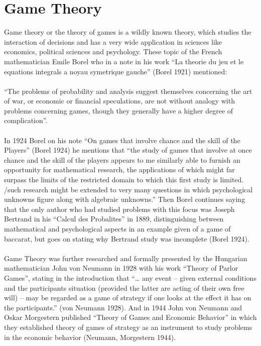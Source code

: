 \documentclass{article}
\begin{document}
\section{Game Theory}\label{first_section}
Game theory or the theory of games is a wildly known theory, which studies the interaction of decisions and has a very wide application in sciences like economics, political sciences and psychology. These topic of the French mathematician Emile Borel who in a note in his work “La theorie du jeu et le equations integrals a noyau symetrique gauche” (Borel 1921) mentioned:
\\\\ “The problems of probability and analysis suggest themselves concerning the art of war, or economic or financial speculations, are not without analogy with problems concerning games, though they generally have a higher degree of complication”.
\\\\ In 1924 Borel on his note “On games that involve chance and the skill of the Players” (Borel 1924) he mentions that “the study of games that involve at once chance and the skill of the players appears to me similarly able to furnish an opportunity for mathematical research, the applications of which might far surpass the limits of the restricted domain to which this first study is limited. /such research might be extended to very many questions in which psychological unknowns figure along with algebraic unknowns.” Then Borel continues saying that the only author who had studied problems with this focus was Joseph Bertrand in his “Calcul des Probalites” in 1889, distinguishing between mathematical and psychological aspects in an example given of a game of baccarat, but goes on stating why Bertrand study was incomplete (Borel 1924).
\\\\ Game Theory was further researched and formally presented by the Hungarian mathematician John von Neumann in 1928 with his work “Theory of Parlor Games”, stating in the introduction that “… any event – given external conditions and the participants situation (provided the latter are acting of their own free will) – may be regarded as a game of strategy if one looks at the effect it has on the participants.” (von Neumann 1928). And in 1944 John von Neumann and Oskar Morgestern published “Theory of Games and Economic Behavior” in which they established theory of games of strategy as an instrument to study problems in the economic behavior (Neumann, Morgestern 1944).
\end{document}
